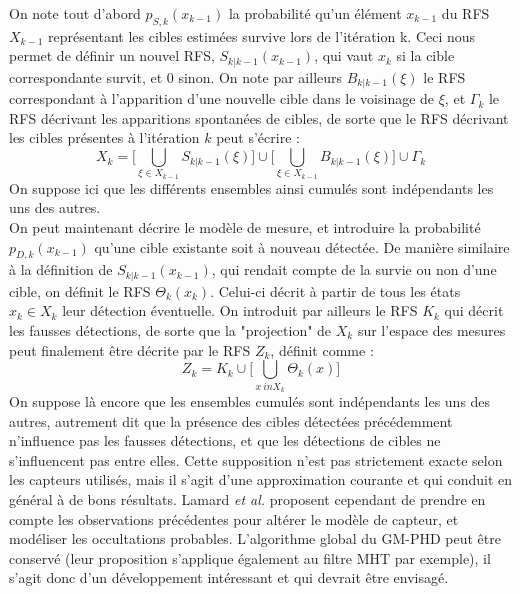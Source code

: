 On note tout d'abord $p_{S,k}(x_{k-1})$ la probabilité qu'un élément $x_{k-1}$ du RFS $X_{k-1}$ représentant les cibles estimées survive lors de l'itération k. Ceci nous permet de définir un nouvel RFS, $S_{k | k-1}(x_{k-1})$, qui vaut $x_{k}$ si la cible correspondante survit, et 0 sinon. On note par ailleurs $B_{k| k-1}(\xi)$ le RFS correspondant à l'apparition d'une nouvelle cible dans le voisinage de $\xi$, et $\Gamma_k$ le RFS décrivant les apparitions spontanées de cibles\label{def:gamma_k}, de sorte que le RFS décrivant les cibles présentes à l'itération $k$ peut s'écrire :
\begin{equation}
	X_k = \lbrack \bigcup_{\xi \in X_{k-1}} S_{k | k-1}(\xi) \rbrack \cup \lbrack \bigcup_{\xi \in X_{k-1}} B_{k| k-1}(\xi) \rbrack \cup \Gamma_k
\end{equation}
On suppose ici que les différents ensembles ainsi cumulés sont indépendants les uns des autres.\\

On peut maintenant décrire le modèle de mesure, et introduire la probabilité $p_{D,k}(x_{k-1})$ qu'une cible existante soit à nouveau détectée. De manière similaire à la définition de $S_{k | k-1}(x_{k-1})$, qui rendait compte de la survie ou non d'une cible, on définit le RFS $\Theta_k(x_k)$. Celui-ci décrit à partir de tous les états $x_k \in X_k$ leur détection éventuelle. On introduit par ailleurs le RFS $K_k$ qui décrit les fausses détections, de sorte que la "projection" de $X_k$ sur l'espace des mesures peut finalement être décrite par le RFS $Z_k$, définit comme :
\begin{equation}
	Z_k = K_k \cup \lbrack \bigcup_{x \ in X_k} \Theta_k (x) \rbrack
\end{equation}
On suppose là encore que les ensembles cumulés sont indépendants les uns des autres, autrement dit que la présence des cibles détectées précédemment n'influence pas les fausses détections, et que les détections de cibles ne s'influencent pas entre elles. Cette supposition n'est pas strictement exacte selon les capteurs utilisés, mais il s'agit d'une approximation courante et qui conduit en général à de bons résultats. Lamard \textit{et al.} \cite{Lamard2012} proposent cependant de prendre en compte les observations précédentes pour altérer le modèle de capteur, et modéliser les occultations probables. L'algorithme global du GM-PHD peut être conservé (leur proposition s'applique également au filtre MHT par exemple), il s'agit donc d'un développement intéressant et qui devrait être envisagé.\\

